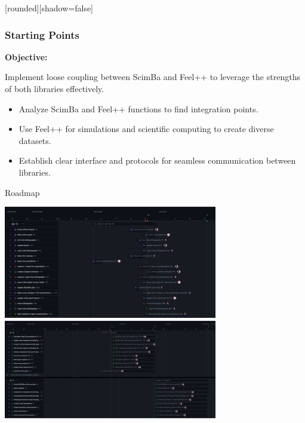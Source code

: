 \documentclass[10pt]{beamer}
\begin{document}

\begin{frame}
    [rounded][shadow=false]
    \frametitle{Starting Points}
    \textbf{Objective:}

    Implement loose coupling between ScimBa and Feel++ to leverage the strengths of both libraries effectively.

    \begin{itemize}
        \item Analyze ScimBa and Feel++ functions to find integration points.
        

        \item Use Feel++ for simulations and scientific computing to create diverse datasets.
        

        \item Establish clear interface and protocols for seamless communication between libraries.
        
        
    \end{itemize}   

\end{frame}



\begin{frame}{Roadmap}
    \begin{center}
        \includegraphics[width=0.7\textwidth]{images/roadmap1.png}
        \vspace{1em} %
        \includegraphics[width=0.7\textwidth]{images/roadmap2.png}
    \end{center}
\end{frame}
\end{document}
